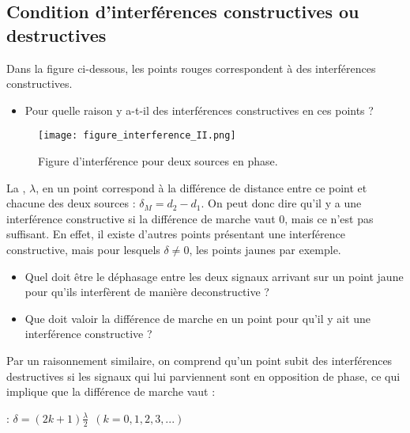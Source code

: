 \newpage

\subsection{Condition d'interférences constructives ou destructives}
Dans la figure ci-dessous, les points rouges correspondent à des interférences constructives.
\begin{itemize}[label=\textbullet]
    \item Pour quelle raison y a-t-il des interférences constructives en ces points ?
\end{itemize}

\begin{figure}[ht]
    \centering
    \texttt{[image: figure\_interference\_II.png]}
    \caption{Figure d'interférence pour deux sources en phase.}
\end{figure}

La , \(\lambda\), en un point correspond à la différence de distance entre ce point et chacune des deux sources : \(\delta _M=d_2 - d_1\). On peut donc dire qu'il y a une interférence constructive si la différence de marche vaut 0, mais ce n'est pas suffisant. En effet, il existe d'autres points présentant une interférence constructive, mais pour lesquels \(\delta \neq 0\), les points jaunes par exemple.

\newpage

\begin{itemize}[label=\textbullet]
    \item Quel doit être le déphasage entre les deux signaux arrivant sur un point jaune pour qu'ils interfèrent de manière deconstructive ?
    \item Que doit valoir la différence de marche en un point pour qu'il y ait une interférence constructive ?
\end{itemize}



Par un raisonnement similaire, on comprend qu'un point subit des interférences destructives si les signaux qui lui parviennent sont en opposition de phase, ce qui implique que la différence de marche vaut :

\begin{encadre}
     : \(\delta = (2k+1) \frac{\lambda}{2} \ \ (k=0,1,2,3,...)\)
\end{encadre}

